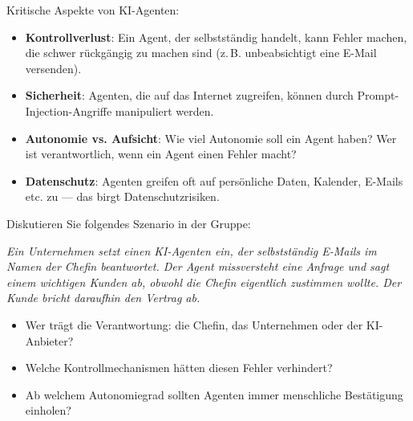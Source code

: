 \begin{mysummary}
      Kritische Aspekte von KI-Agenten:
      \begin{itemize}
            \item \textbf{Kontrollverlust}: Ein Agent, der selbstständig handelt,
                  kann Fehler machen, die schwer rückgängig zu machen sind
                  (z.\,B. unbeabsichtigt eine E-Mail versenden).
            \item \textbf{Sicherheit}: Agenten, die auf das Internet zugreifen,
                  können durch Prompt-Injection-Angriffe manipuliert werden.
            \item \textbf{Autonomie vs. Aufsicht}: Wie viel Autonomie soll ein Agent haben?
                  Wer ist verantwortlich, wenn ein Agent einen Fehler macht?
            \item \textbf{Datenschutz}: Agenten greifen oft auf persönliche Daten,
                  Kalender, E-Mails etc. zu --- das birgt Datenschutzrisiken.
      \end{itemize}
\end{mysummary}

\begin{myexercise}
      Diskutieren Sie folgendes Szenario in der Gruppe:

      \textit{Ein Unternehmen setzt einen KI-Agenten ein, der selbstständig
            E-Mails im Namen der Chefin beantwortet. Der Agent missversteht eine Anfrage
            und sagt einem wichtigen Kunden ab, obwohl die Chefin eigentlich zustimmen wollte.
            Der Kunde bricht daraufhin den Vertrag ab.}

      \begin{itemize}
            \item Wer trägt die Verantwortung: die Chefin, das Unternehmen oder
                  der KI-Anbieter?
            \item Welche Kontrollmechanismen hätten diesen Fehler verhindert?
            \item Ab welchem Autonomiegrad sollten Agenten immer menschliche
                  Bestätigung einholen?
      \end{itemize}
\end{myexercise}

